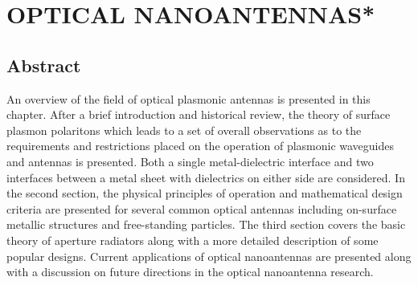 \chapter{\uppercase{Optical nanoantennas*}}
%
%
%
\section{Abstract}
%
An overview of the field of optical plasmonic antennas is presented in this chapter. After a brief introduction and historical review, the theory of surface plasmon polaritons which leads to a set of overall observations as to the requirements and restrictions placed on the operation of plasmonic waveguides and antennas is presented. Both a single metal-dielectric interface and two interfaces between a metal sheet with dielectrics on either side are considered. In the second section, the physical principles of operation and mathematical design criteria are presented for several common optical antennas including on-surface metallic structures and free-standing particles. The third section covers the basic theory of aperture radiators along with a more detailed description of some popular designs. Current applications of optical nanoantennas are presented along with a discussion on future directions in the optical nanoantenna research.
%
